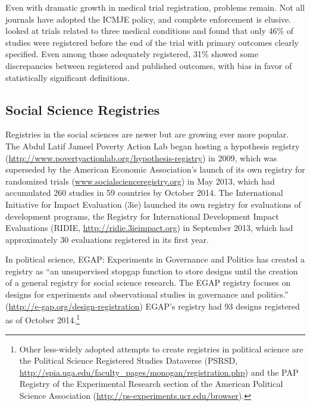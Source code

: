 \documentclass[12pt] {article}
\begin{document}
Even with dramatic growth in medical trial registration, problems
remain. Not all journals have adopted the ICMJE policy, and complete
enforcement is elusive. \cite{mathieu_s_comparison_2009} looked at trials related
to three medical conditions and found that only 46\% of studies were
registered before the end of the trial with primary outcomes clearly
specified. Even among those adequately registered, 31\% showed some
discrepancies between registered and published outcomes, with bias in
favor of statistically significant definitions.

\subsection{Social Science Registries}\label{social-science-registries}

Registries in the social sciences are newer but are growing ever more
popular. The Abdul Latif Jameel Poverty Action Lab began hosting a
hypothesis registry
(\url{http://www.povertyactionlab.org/hypothesis-registry}) in 2009,
which was superseded by the American Economic Association's launch of
its own registry for randomized trials
(\href{http://www.socialscienceregistry.org}{www.socialscienceregistry.org})
in May 2013, which had accumulated 260 studies in 59 countries by
October 2014. The International Initiative for Impact Evaluation (3ie)
launched its own registry for evaluations of development programs, the
Registry for International Development Impact Evaluations (RIDIE,
\url{http://ridie.3ieimpact.org}) in September 2013, which had
approximately 30 evaluations registered in its first year.

In political science, EGAP: Experiments in Governance and Politics has
created a registry as ``an unsupervised stopgap function to store
designs until the creation of a general registry for social science
research. The EGAP registry focuses on designs for experiments and
observational studies in governance and politics.''
(\url{http://e-gap.org/design-registration}) EGAP's registry had 93
designs registered as of October 2014.\footnote{Other less-widely
  adopted attempts to create registries in political science are the
  Political Science Registered Studies Dataverse (PSRSD,
  \href{../customXml/item1.xml}{http://spia.uga.edu/faculty\_pages/monogan/registration.php})
  and the PAP Registry of the Experimental Research section of the
  American Political Science Association
  (\href{numbering.xml}{http://ps-experiments.ucr.edu/browser}).}
\end{document}
